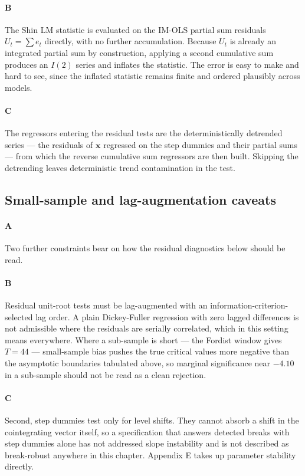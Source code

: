 \paragraph{B}
The Shin LM statistic is evaluated on the IM-OLS partial sum residuals $U_t = \sum e_t$ directly, with no further accumulation. Because $U_t$ is already an integrated partial sum by construction, applying a second cumulative sum produces an $I(2)$ series and inflates the statistic. The error is easy to make and hard to see, since the inflated statistic remains finite and ordered plausibly across models.

\paragraph{C}
The regressors entering the residual tests are the deterministically detrended series — the residuals of $\mathbf{x}$ regressed on the step dummies and their partial sums — from which the reverse cumulative sum regressors are then built. Skipping the detrending leaves deterministic trend contamination in the test.

\subsection{Small-sample and lag-augmentation caveats}

\paragraph{A}
Two further constraints bear on how the residual diagnostics below should be read.

\paragraph{B}
Residual unit-root tests must be lag-augmented with an information-criterion-selected lag order. A plain Dickey-Fuller regression with zero lagged differences is not admissible where the residuals are serially correlated, which in this setting means everywhere. Where a sub-sample is short — the Fordist window gives $T=44$ — small-sample bias pushes the true critical values more negative than the asymptotic boundaries tabulated above, so marginal significance near $-4.10$ in a sub-sample should not be read as a clean rejection.

\paragraph{C}
Second, step dummies test only for level shifts. They cannot absorb a shift in the cointegrating vector itself, so a specification that answers detected breaks with step dummies alone has not addressed slope instability and is not described as break-robust anywhere in this chapter. Appendix E takes up parameter stability directly.

